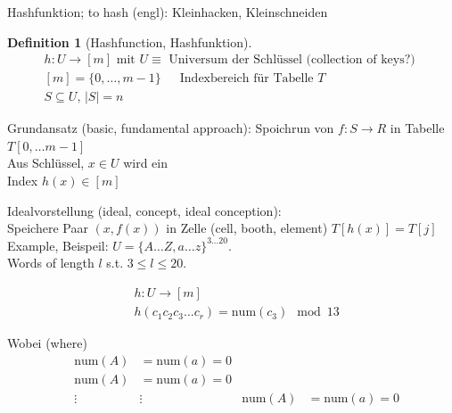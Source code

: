 \documentclass[10pt]{amsart}
\newtheorem{definition}{Definition}
\begin{document}
\begin{multicols*}{2}
Hashfunktion; to hash (engl): Kleinhacken, Kleinschneiden
\begin{definition}[Hashfunction, Hashfunktion]
\begin{equation}
\begin{gathered} 
h: U \to [m ] \text{ mit } 
U \equiv \text{ Universum der Schl\"{u}ssel  (collection of keys?) } \\
[m] = \lbrace 0 , \dots , m-1 \rbrace \quad \, \text{ Indexbereich f\"{u}r Tabelle } T \\
S \subseteq U, \, |S| = n
\end{gathered} 
\end{equation}
\end{definition}


Grundansatz (basic, fundamental approach): Spoichrun von $f: S \to R$ in Tabelle $T[0, \dots m-1]$ \\

Aus Schl\"{u}ssel, $x\in U$ wird ein \\
Index $h(x) \in [m]$

Idealvorstellung (ideal, concept, ideal conception): \\
Speichere Paar $(x, f(x))$ in Zelle (cell, booth, element) $T[h(x)] = T[j]$ \\

Example, Beispeil: $U = \lbrace A \dots Z, a\dots z \rbrace^{3 \dots 20}$. \\
Words of length $l$ s.t. $3\leq l \leq 20$.

\[
\begin{aligned}
& h : U \to [m] \\
& h(c_1c_2 c_3 \dots c_r) = \text{num}(c_3) \mod{ 13}
\end{aligned}
\]

Wobei (where) 
\[
\begin{aligned}
& \text{num}{(A)} &= \text{num}{(a)} = 0 \\
& \text{num}{(A)} &= \text{num}{(a)} = 0 \\
& \vdots & \vdots 
& \text{num}{(A)} &= \text{num}{(a)} = 0 
\end{aligned}
\]


\end{multicols*}
\end{document}
